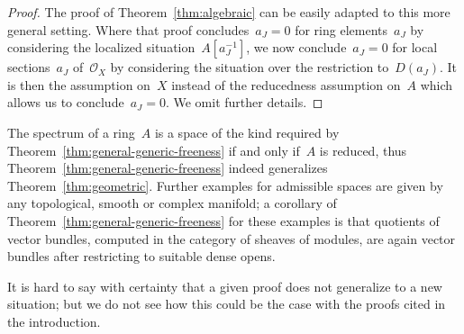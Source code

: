 \documentclass[oneside]{amsart}
\theoremstyle{definition}
\theoremstyle{plain}
\theoremstyle{remark}
\renewcommand{\O}{\mathcal{O}}
\begin{document}
\begin{proof}The proof of Theorem~\ref{thm:algebraic} can be easily adapted to
this more general setting. Where that proof concludes~$a_J = 0$ for ring
elements~$a_J$ by considering the localized situation~$A[a_J^{-1}]$, we now
conclude~$a_J = 0$ for local sections~$a_J$ of~$\O_X$ by considering the
situation over the restriction to~$D(a_J)$. It is then the assumption on~$X$
instead of the reducedness assumption on~$A$ which allows us to conclude~$a_J = 0$.
We omit further details.
\end{proof}

The spectrum of a ring~$A$ is a space of the kind required by
Theorem~\ref{thm:general-generic-freeness} if and only if~$A$ is reduced,
thus Theorem~\ref{thm:general-generic-freeness} indeed
generalizes Theorem~\ref{thm:geometric}. Further examples for admissible spaces
are given by any topological, smooth or complex manifold; a corollary
of Theorem~\ref{thm:general-generic-freeness} for these examples is that
quotients of vector bundles, computed in the category of sheaves of modules,
are again vector bundles after restricting to suitable dense opens.

It is hard to say with certainty that a given proof does not generalize to a
new situation; but we do not see how this could be the case with the proofs
cited in the introduction.


\printbibliography
\end{document}
